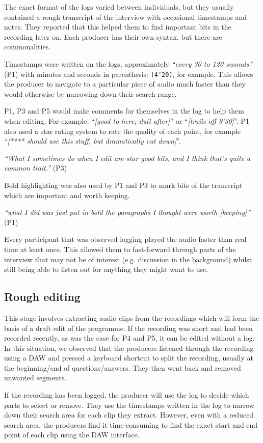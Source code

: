 The exact format of the logs varied between individuals, but they usually contained a rough transcript of the interview
with occasional timestamps and notes. They reported that this helped them to find important bits in the recording later
on. Each producer has their own syntax, but there are commonalities.

Timestamps were written on the logs, approximately \textit{``every 30 to 120 seconds''} (P1) with minutes and seconds
in parenthesis: \texttt{(4'20)}, for example.  This allows the producer to navigate to a particular piece of audio much
faster than they would otherwise by narrowing down their search range.

P1, P3 and P5 would make comments for themselves in the log to help them when editing. For example, ``\textit{[good to
  here, dull after]}'' or ``\textit{[trails off 9'30]}''. P1 also used a star rating system to rate the quality of each
point, for example ``\textit{[**** should use this stuff, but dramatically cut down]}''.

\textit{``What I sometimes do when I edit are star good bits, and I think that's quite a common trait.''} (P3)

Bold highlighting was also used by P1 and P3 to mark bits of the transcript which are important and worth keeping.

\textit{``what I did was just put in bold the paragraphs I thought were worth [keeping]''} (P1)

Every participant that was observed logging played the audio faster than real time at least once. This allowed them to
fast-forward through parts of the interview that may not be of interest (e.g. discussion in the background) whilst
still being able to listen out for anything they might want to use.

\subsection{Rough editing}
This stage involves extracting audio clips from the recordings which will form the basis of a draft edit of the
programme. If the recording was short and had been recorded recently, as was the case for P4 and P5, it can be edited
without a log. In this situation, we observed that the producers listened through the recording using a DAW and pressed
a keyboard shortcut to split the recording, usually at the beginning/end of questions/answers. They then went back and
removed unwanted segments.

If the recording has been logged, the producer will use the log to decide which parts to select or remove. They use the
timestamps written in the log to narrow down their search area for each clip they extract. However, even with a reduced
search area, the producers find it time-consuming to find the exact start and end point of each clip using the DAW
interface.

